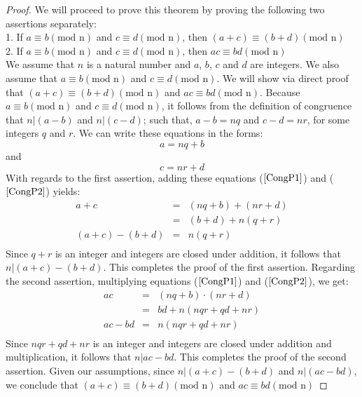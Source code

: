 \begin{proof}


We will proceed to prove this theorem by proving the following two assertions separately: \\
1. If $a \equiv b (\text{mod n})$ and $c \equiv d (\text{mod n})$, then $(a + c) \equiv (b + d) (\text{mod n})$\\
2. If $a \equiv b (\text{mod n})$ and $c \equiv d (\text{mod n})$, then $ac \equiv bd (\text{mod n})$ \\
We assume that $n$ is a natural number and $a$, $b$, $c$ and $d$ are integers. We also assume that $a \equiv b (\text{mod n})$ and $c \equiv d (\text{mod n})$. We will show via direct proof that $(a + c) \equiv (b + d) (\text{mod n})$ and $ac \equiv bd (\text{mod n})$. Because $a \equiv b (\text{mod n})$ and $c \equiv d (\text{mod n})$, it follows from the definition of congruence that $n|(a-b)$ and $n|(c-d)$; such that, $a-b = nq$ and $c-d = nr$, for some integers $q$ and $r$. We can write these equations in the forms:
	\begin{equation}
	\label{CongP1}
		a = nq + b
	\end{equation}
and 
	\begin{equation}
	\label{CongP2}
		c = nr + d	
	\end{equation}
With regards to the first assertion, adding these equations ($\ref{CongP1}$) and ($\ref{CongP2}$) yields: 
	\begin{eqnarray}
		a + c & = & (nq + b) + (nr + d) \nonumber \\
		& = & (b+d) + n(q + r) \nonumber \\
		(a + c) - (b + d) & = & n(q + r) \nonumber \\
	\end{eqnarray}	 
Since $q + r$ is an integer and integers are closed under addition, it follows that $n | (a + c) - (b + d)$. This completes the proof of the first assertion. 
Regarding the second assertion, multiplying equations ($\ref{CongP1}$) and ($\ref{CongP2}$), we get: 
	\begin{eqnarray}
		ac & = & (nq + b) \cdot (nr + d) \nonumber \\
		& = & bd + n(nqr + qd + nr) \nonumber \\
		ac - bd & = & n(nqr + qd + nr) \nonumber \\
	\end{eqnarray}	 
Since $nqr + qd + nr$ is an integer and integers are closed under addition and multiplication, it follows that $n | ac - bd$. This completes the proof of the second assertion. Given our assumptions, since $n | (a + c) - (b + d)$ and $n | (ac - bd)$, we conclude that $(a + c) \equiv (b + d) (\text{mod n})$ and $ac \equiv bd (\text{mod n})$

\end{proof}



